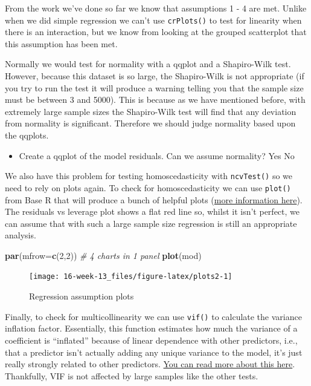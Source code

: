 \documentclass[]{book}
\newenvironment{Shaded}{\begin{snugshade}}{\end{snugshade}}
\newcommand{\CommentTok}[1]{\textcolor[rgb]{0.56,0.35,0.01}{\textit{#1}}}
\newcommand{\DataTypeTok}[1]{\textcolor[rgb]{0.13,0.29,0.53}{#1}}
\newcommand{\DecValTok}[1]{\textcolor[rgb]{0.00,0.00,0.81}{#1}}
\newcommand{\KeywordTok}[1]{\textcolor[rgb]{0.13,0.29,0.53}{\textbf{#1}}}
\newcommand{\NormalTok}[1]{#1}
\providecommand{\tightlist}{%
  \setlength{\itemsep}{0pt}\setlength{\parskip}{0pt}}
\begin{document}
From the work we've done so far we know that assumptions 1 - 4 are met. Unlike when we did simple regression we can't use \texttt{crPlots()} to test for linearity when there is an interaction, but we know from looking at the grouped scatterplot that this assumption has been met.

Normally we would test for normality with a qqplot and a Shapiro-Wilk test. However, because this dataset is so large, the Shapiro-Wilk is not appropriate (if you try to run the test it will produce a warning telling you that the sample size must be between 3 and 5000). This is because as we have mentioned before, with extremely large sample sizes the Shapiro-Wilk test will find that any deviation from normality is significant. Therefore we should judge normality based upon the qqplots.

\begin{itemize}
\tightlist
\item
  Create a qqplot of the model residuals. Can we assume normality? Yes No
\end{itemize}

We also have this problem for testing homoscedasticity with \texttt{ncvTest()} so we need to rely on plots again. To check for homoscedasticity we can use \texttt{plot()} from Base R that will produce a bunch of helpful plots (\href{https://www.r-bloggers.com/how-to-detect-heteroscedasticity-and-rectify-it/}{more information here}). The residuals vs leverage plot shows a flat red line so, whilst it isn't perfect, we can assume that with such a large sample size regression is still an appropriate analysis.

\begin{Shaded}
\begin{Highlighting}[]
\KeywordTok{par}\NormalTok{(}\DataTypeTok{mfrow=}\KeywordTok{c}\NormalTok{(}\DecValTok{2}\NormalTok{,}\DecValTok{2}\NormalTok{)) }\CommentTok{# 4 charts in 1 panel}
\KeywordTok{plot}\NormalTok{(mod)}
\end{Highlighting}
\end{Shaded}

\begin{figure}

{\centering \texttt{[image: 16-week-13\_files/figure-latex/plots2-1]} 

}

\caption{Regression assumption plots}\label{fig:plots2}
\end{figure}

Finally, to check for multicollinearity we can use \texttt{vif()} to calculate the variance inflation factor. Essentially, this function estimates how much the variance of a coefficient is ``inflated'' because of linear dependence with other predictors, i.e., that a predictor isn't actually adding any unique variance to the model, it's just really strongly related to other predictors. \href{https://statisticalhorizons.com/multicollinearity}{You can read more about this here}. Thankfully, VIF is not affected by large samples like the other tests.
\end{document}
